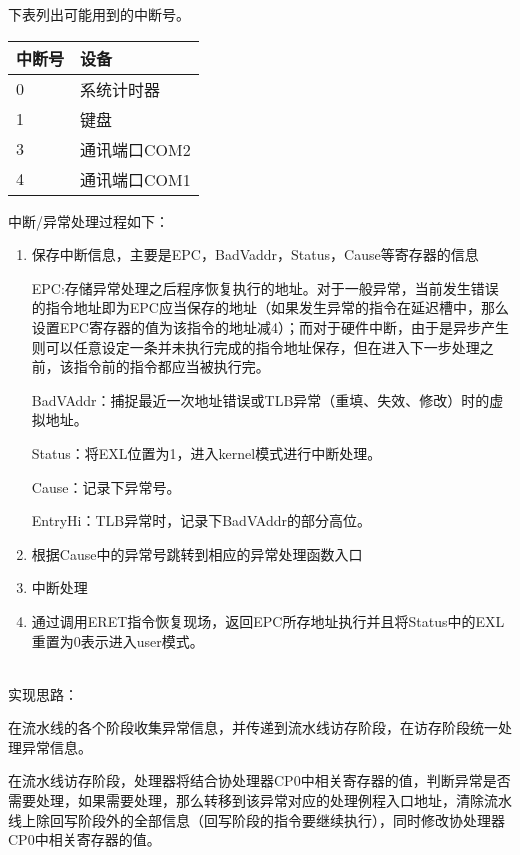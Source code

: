下表列出可能用到的中断号。

\begin{table}[H]
	\centering
	\begin{tabular}{ll}
		\hline
		中断号&设备\\
		\hline
		0&系统计时器\\
		1&键盘\\
		3&通讯端口COM2\\
		4&通讯端口COM1\\
		\hline
	\end{tabular}
\end{table}

中断/异常处理过程如下：

\begin{enumerate}[(1)]
	\item 保存中断信息，主要是EPC，BadVaddr，Status，Cause等寄存器的信息
	
	\qquad EPC:存储异常处理之后程序恢复执行的地址。对于一般异常，当前发生错误的指令地址即为EPC应当保存的地址（如果发生异常的指令在延迟槽中，那么设置EPC寄存器的值为该指令的地址减4）；而对于硬件中断，由于是异步产生则可以任意设定一条并未执行完成的指令地址保存，但在进入下一步处理之前，该指令前的指令都应当被执行完。
	
	\qquad BadVAddr：捕捉最近一次地址错误或TLB异常（重填、失效、修改）时的虚拟地址。
	
	\qquad Status：将EXL位置为1，进入kernel模式进行中断处理。
	
	\qquad Cause：记录下异常号。
	
	\qquad EntryHi：TLB异常时，记录下BadVAddr的部分高位。
	
	\item 根据Cause中的异常号跳转到相应的异常处理函数入口
	
	\item 中断处理
	
	\item 通过调用ERET指令恢复现场，返回EPC所存地址执行并且将Status中的EXL重置为0表示进入user模式。
	
\end{enumerate}

\quad \\
实现思路：

在流水线的各个阶段收集异常信息，并传递到流水线访存阶段，在访存阶段统一处理异常信息。

在流水线访存阶段，处理器将结合协处理器CP0中相关寄存器的值，判断异常是否需要处理，如果需要处理，那么转移到该异常对应的处理例程入口地址，清除流水线上除回写阶段外的全部信息（回写阶段的指令要继续执行），同时修改协处理器CP0中相关寄存器的值。

